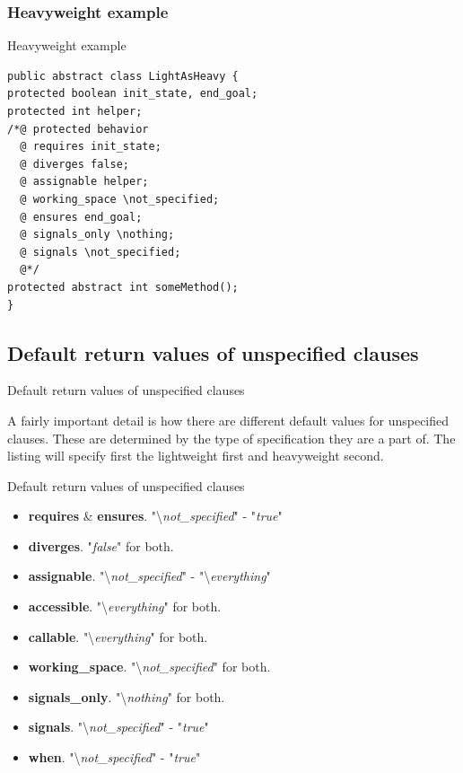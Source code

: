 \documentclass{beamer}
\begin{document}
\subsubsection{Heavyweight example}
\begin{frame}[fragile]{Heavyweight example}
    \begin{lstlisting}
public abstract class LightAsHeavy {
protected boolean init_state, end_goal;
protected int helper;
/*@ protected behavior
  @ requires init_state;
  @ diverges false;
  @ assignable helper;
  @ working_space \not_specified;
  @ ensures end_goal;
  @ signals_only \nothing;
  @ signals \not_specified;
  @*/
protected abstract int someMethod();
}       
    \end{lstlisting}
   
\end{frame}

\subsection{Default return values of unspecified clauses}
\begin{frame}{Default return values of unspecified clauses}

A fairly important detail is how there are different default values for unspecified clauses. These are determined by the type of specification they are a part of. The listing will specify first the lightweight first and heavyweight second.

\end{frame}

\begin{frame}{Default return values of unspecified clauses}
\begin{itemize}
    \item \textbf{requires} \& \textbf{ensures}. "\textbackslash \textit{not\_specified}" - "\textit{true}"
    \item \textbf{diverges}. "\textit{false}" for both.
    \item \textbf{assignable}. "\textbackslash \textit{not\_specified}" - "\textbackslash \textit{everything}" 
    \item \textbf{accessible}. "\textbackslash \textit{everything}" for both.
    \item \textbf{callable}. "\textbackslash \textit{everything}" for both.
    \item \textbf{working\_space}. "\textbackslash \textit{not\_specified}" for both.
    \item \textbf{signals\_only}. "\textbackslash \textit{nothing}" for both.
    \item \textbf{signals}. "\textbackslash \textit{not\_specified}" - "\textit{true}"
    \item \textbf{when}. "\textbackslash \textit{not\_specified}" - "\textit{true}"


\end{itemize}
\end{frame}
\end{document}

